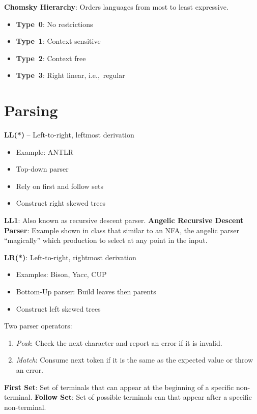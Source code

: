 \documentclass[10pt,twocolumn]{report}
\begin{document}
  
  \textbf{Chomsky Hierarchy}: Orders languages from most to least expressive.
  \begin{itemize}
    \item \textbf{Type~0}: No restrictions
    \item \textbf{Type~1}: Context sensitive
    \item \textbf{Type~2}: Context free
    \item \textbf{Type~3}: Right linear, i.e.,~regular
  \end{itemize}
  
  \section{Parsing}
  
  \textbf{LL(*)} -- Left-to-right, leftmost derivation
  \begin{itemize}
    \item Example: ANTLR
    \item Top-down parser
    \item Rely on first and follow sets
    \item Construct right skewed trees
  \end{itemize}
  \textbf{LL1}: Also known as recursive descent parser.
  \textbf{Angelic Recursive Descent Parser}: Example shown in class that similar to an NFA, the angelic parser ``magically'' which production to select at any point in the input.

  \textbf{LR(*)}: Left-to-right, rightmost derivation
  \begin{itemize}
    \item Examples: Bison, Yacc, CUP 
    \item Bottom-Up parser: Build leaves then parents
    \item Construct left skewed trees
  \end{itemize}

  Two parser operators:
  \begin{enumerate}
    \item \textit{Peak}: Check the next character and report an error if it is invalid.
    \item \textit{Match}: Consume next token if it is the same as the expected value or throw an error.
  \end{enumerate}

  \textbf{First Set}: Set of terminals that can appear at the beginning of a specific non-terminal. \textbf{Follow Set}: Set of possible terminals can that appear after a specific non-terminal.
  
\end{document}
